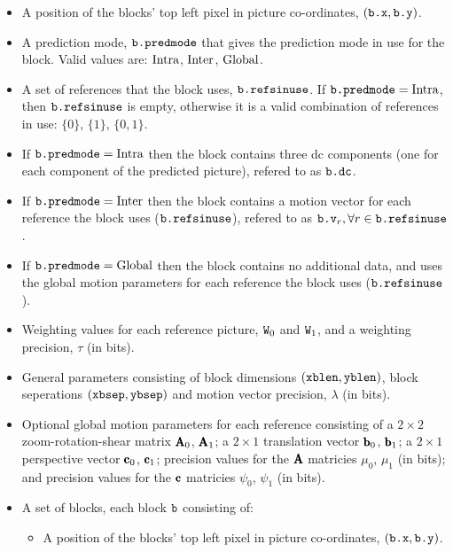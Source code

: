 \begin{itemize}
    \item A position of the blocks' top left pixel in picture
    co-ordinates, $(\text{\texttt{b.x}}, \text{\texttt{b.y}})$.

    \item A prediction mode, $\text{\texttt{b.predmode}}$ that gives the prediction mode
    in use for the block.  Valid values are: $\text{Intra}$, $\text{Inter}$,
    $\text{Global}$.

    \item A set of references that the block uses, $\text{\texttt{b.refsinuse}}$.
    If $\text{\texttt{b.predmode}} = \text{Intra}$, then $\text{\texttt{b.refsinuse}}$ is empty, otherwise
    it is a valid combination of references in use: $\lbrace0\rbrace$,
    $\lbrace1\rbrace$, $\lbrace0,1\rbrace$.

    \item If $\text{\texttt{b.predmode}} = \text{Intra}$ then the block contains three dc
    components (one for each component of the predicted picture),
    refered to as $\text{\texttt{b.dc}}$.

    \item If $\text{\texttt{b.predmode}} = \text{Inter}$ then the block contains a motion
    vector for each reference the block uses ($\text{\texttt{b.refsinuse}}$), refered to
    as $\text{\texttt{b.v}}_r, \forall r \in \text{\texttt{b.refsinuse}}$.

    \item If $\text{\texttt{b.predmode}} = \text{Global}$ then the block contains no
    additional data, and uses the global motion parameters for each
    reference the block uses ($\text{\texttt{b.refsinuse}}$).



\item Weighting values for each reference picture, $\text{\texttt{W}}_0$ and $\text{\texttt{W}}_1$,
and a weighting precision, $\tau$ (in bits).

\item General parameters consisting of block dimensions $(\text{\texttt{xblen}},
\text{\texttt{yblen}})$, block seperations $(\text{\texttt{xbsep}}, \text{\texttt{ybsep}})$ and motion vector
precision, $\lambda$ (in bits).

\item Optional global motion parameters for each reference consisting of
a $2\times2$ zoom-rotation-shear matrix $\pmb{\text{A}}_0$, $\pmb{\text{A}}_1$; a
$2\times1$ translation vector $\pmb{\text{b}}_0$, $\pmb{\text{b}}_1$; a $2\times1$
perspective vector $\pmb{\text{c}}_0$, $\pmb{\text{c}}_1$; precision values for the $\pmb{\text{A}}$
matricies $\mu_0$, $\mu_1$ (in bits); and precision values for the
$\pmb{\text{c}}$ matricies $\psi_0$, $\psi_1$ (in bits).

\item A set of blocks, each block $\text{\texttt{b}}$ consisting of:
  \begin{itemize}
    \item A position of the blocks' top left pixel in picture
    co-ordinates, $(\text{\texttt{b.x}}, \text{\texttt{b.y}})$.


\end{itemize}
\end{itemize}
